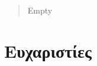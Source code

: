 \begin{abstract}
  Empty
\end{abstract}

\thispagestyle{empty}


\section*{Ευχαριστίες} \thispagestyle{empty}

%
